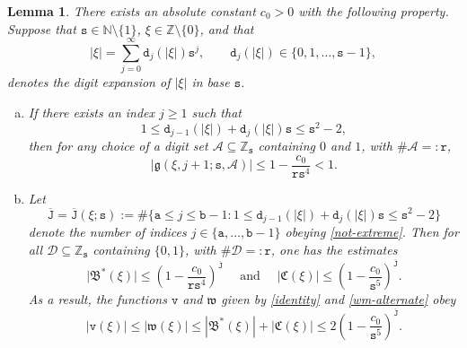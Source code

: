 \documentclass[12pt, twoside]{article}
\newtheorem{lemma}[theorem]{Lemma}
\theoremstyle{definition}
\numberwithin{equation}{section}
\begin{document}
\begin{lemma} \label{restricted-lemma}
There exists an absolute constant $c_0 > 0$ with the following property. Suppose that $\mathtt s \in \mathbb N \setminus \{1\}$, $\xi \in \mathbb Z \setminus \{0\}$, and that 
\begin{equation} \label{xi-expansion} |\xi| = \sum_{j=0}^{\infty} \mathtt d_j(|\xi|) \mathtt s^j, \qquad \mathtt d_j(|\xi|) \in \{0, 1, \ldots, \mathtt s-1\},  \end{equation} 
denotes the digit expansion of $|\xi|$ in base $\mathtt s$. 
\begin{enumerate}[(a)]
\item \label{restricted-lemma-part-a} If there exists an index $j \geq 1$ such that 
\begin{equation} \label{not-extreme}
1 \leq \mathtt d_{j-1}(|\xi|) + \mathtt d_j(|\xi|) \mathtt s \leq \mathtt s^2-2,   
\end{equation}  
then for any choice of a digit set $\mathscr{A} \subseteq \mathbb Z_{\mathtt s}$ containing $0$ and $1$, with $\#\mathscr{A}=:\mathtt r$,
\begin{equation} \label{less-than-one}
\bigl|\mathfrak g(\xi, j+1; \mathtt s, \mathscr{A})| \leq 1 - \frac{c_0}{\mathtt r \mathtt s^4} < 1. 
\end{equation}   
\item \label{restricted-lemma-part-b} Let
\begin{equation} \label{def-cardinality-J}
\overline{\mathtt J} = \overline{\mathtt J}(\xi; \mathtt s) :=  \# \bigl\{ \mathtt a \leq j \leq \mathtt b-1 : 1 \leq \mathtt d_{j-1}(|\xi|) + \mathtt d_j(|\xi|) \mathtt s \leq \mathtt s^2-2 \bigr\}
\end{equation} 
denote the number of indices $j \in \{\mathtt a, \ldots, \mathtt b-1\}$ obeying \eqref{not-extreme}. Then for all $\mathscr{D} \subseteq \mathbb Z_{\mathtt s}$ containing $\{0, 1\}$, with $\#\mathscr{D}=:\mathtt r$, one has the estimates
\begin{equation} \label{B*C-special-estimates}
\bigl| \mathfrak B^{\ast}(\xi) \bigr| \leq \left(1 - \frac{c_0}{\mathtt r \mathtt s^4} \right)^{\overline{\mathtt J}} \quad \text{ and } \quad \bigl| \mathfrak C(\xi) \bigr| \leq \left(1 - \frac{c_0}{\mathtt s^5}\right)^{\overline{\mathtt J}}.
\end{equation} 
As a result, the functions $\mathtt v$ and $\mathfrak w$ given by \eqref{identity} and \eqref{wm-alternate} obey 
\begin{equation} 
|\mathtt v(\xi)| \leq |\mathfrak w(\xi)| \leq |\mathfrak B^{\ast}(\xi)| + |\mathfrak C(\xi)| \leq 2 \left(1 - \frac{c_0}{\mathtt s^5}\right)^{\overline{\mathtt J}}. \label{v-pointwise-2}
\end{equation}  
\end{enumerate} 
\end{lemma} 
\end{document}
